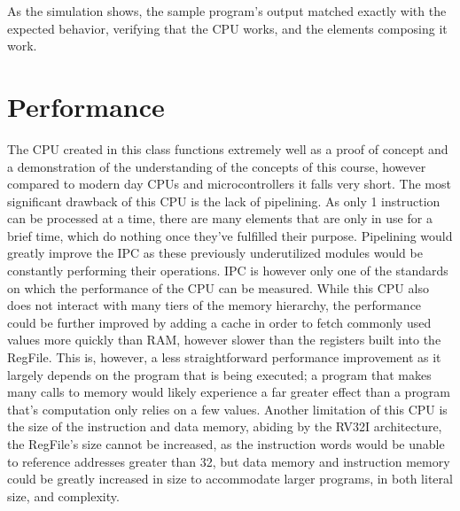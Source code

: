 \documentclass[10pt,letterpaper]{article}
\begin{document}
As the simulation shows, the sample program’s output matched exactly with the expected behavior, verifying that the CPU works, and the elements composing it work.
\newpage
\section{Performance}
The CPU created in this class functions extremely well as a proof of concept and a demonstration of the understanding of the concepts of this course, however compared to modern day CPUs and microcontrollers it falls very short. The most significant drawback of this CPU is the lack of pipelining. As only 1 instruction can be processed at a time, there are many elements that are only in use for a brief time, which do nothing once they’ve fulfilled their purpose. Pipelining would greatly improve the IPC as these previously underutilized modules would be constantly performing their operations. IPC is however only one of the standards on which the performance of the CPU can be measured. While this CPU also does not interact with many tiers of the memory hierarchy, the performance could be further improved by adding a cache in order to fetch commonly used values more quickly than RAM, however slower than the registers built into the RegFile. This is, however, a less straightforward performance improvement as it largely depends on the program that is being executed; a program that makes many calls to memory would likely experience a far greater effect than a program that’s computation only relies on a few values. Another limitation of this CPU is the size of the instruction and data memory, abiding by the RV32I architecture, the RegFile’s size cannot be increased, as the instruction words would be unable to reference addresses greater than 32, but data memory and instruction memory could be greatly increased in size to accommodate larger programs, in both literal size, and complexity. 
\end{document}
